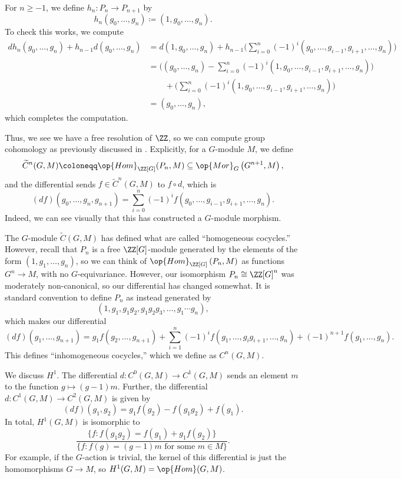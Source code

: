 \documentclass[../notes.tex]{subfiles}
\begin{document}
\begin{itemize}
	For $n\ge-1$, we define $h_n\colon P_n\to P_{n+1}$ by
	\[h_n(g_0,\ldots,g_n)\coloneqq(1,g_0,\ldots,g_n).\]
	To check this works, we compute
	\begin{align*}
		dh_n(g_0,\ldots,g_n)+h_{n-1}d(g_0,\ldots,g_n) &= d(1,g_0,\ldots,g_n)+h_{n-1}\Bigg(\sum_{i=0}^n(-1)^i(g_0,\ldots,g_{i-1},g_{i+1},\ldots,g_n)\Bigg) \\
		&= \Bigg((g_0,\ldots,g_n)-\sum_{i=0}^n(-1)^i(1,g_0,\ldots,g_{i-1},g_{i+1},\ldots,g_n)\Bigg) \\
		&\qquad+\Bigg(\sum_{i=0}^n(-1)^i(1,g_0,\ldots,g_{i-1},g_{i+1},\ldots,g_n)\Bigg) \\
		&= (g_0,\ldots,g_n),
	\end{align*}
	which completes the computation.
\end{itemize}
Thus, we see we have a free resolution of $\ZZ$, so we can compute group cohomology as previously discussed in . Explicitly, for a $G$-module $M$, we define
\[\widetilde C^n(G,M)\coloneqq\op{Hom}_{\ZZ[G]}(P_n,M)\subseteq\op{Mor}_G\left(G^{n+1},M\right),\]
and the differential sends $f\in\widetilde C^n(G,M)$ to $f\circ d$, which is
\[(df)(g_0,\ldots,g_n,g_{n+1})=\sum_{i=0}^n(-1)^if(g_0,\ldots,g_{i-1},g_{i+1},\ldots,g_n).\]
Indeed, we can see visually that this has constructed a $G$-module morphism.

The $G$-module $\widetilde C(G,M)$ has defined what are called ``homogeneous cocycles.'' However, recall that $P_n$ is a free $\ZZ[G]$-module generated by the elements of the form $(1,g_1,\ldots,g_n)$, so we can think of $\op{Hom}_{\ZZ[G]}\left(P_n,M\right)$ as functions $G^n\to M$, with no $G$-equivariance. However, our isomorphism $P_n\cong\ZZ[G]^n$ was moderately non-canonical, so our differential has changed somewhat. It is standard convention to define $P_n$ as instead generated by
\[(1,g_1,g_1g_2,g_1g_2g_3,\ldots,g_1\cdots g_n),\]
which makes our differential
\[(df)(g_1,\ldots,g_{n+1})=g_1f(g_2,\ldots,g_{n+1})+\sum_{i=1}^n(-1)^if(g_1,\ldots,g_ig_{i+1},\ldots,g_n)+(-1)^{n+1}f(g_1,\ldots,g_n).\]
This defines ``inhomogeneous cocycles,'' which we define as $C^n(G,M)$.
\begin{example}
	We discuss $H^1$. The differential $d\colon C^0(G,M)\to C^1(G,M)$ sends an element $m$ to the function $g\mapsto(g-1)m$. Further, the differential $d\colon C^1(G,M)\to C^2(G,M)$ is given by
	\[(df)(g_1,g_2)=g_1f(g_2)-f(g_1g_2)+f(g_1).\]
	In total, $H^1(G,M)$ is isomorphic to
	\[\frac{\{f:f(g_1g_2)=f(g_1)+g_1f(g_2)\}}{\{f:f(g)=(g-1)m\text{ for some }m\in M\}}.\]
	For example, if the $G$-action is trivial, the kernel of this differential is just the homomorphisms $G\to M$, so $H^1(G,M)=\op{Hom}(G,M)$.
\end{example}
\end{document}
